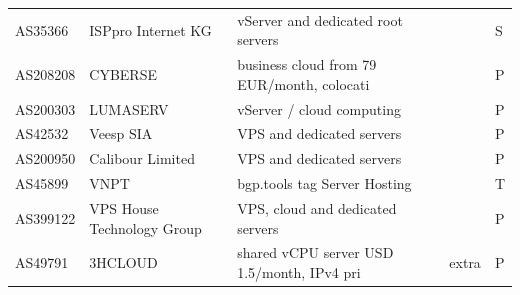 \begin{table}[t]
\begin{tabular*}{\linewidth}{@{\extracolsep{\fill}}lllrll}
AS35366 & ISPpro Internet KG & vServer and dedicated root servers &  &  & S \\ 
AS208208 & CYBERSE & business cloud from 79 EUR/month, colocati &  &  & P \\ 
AS200303 & LUMASERV & vServer / cloud computing &  &  & P \\ 
AS42532 & Veesp SIA & VPS and dedicated servers &  &  & P \\ 
AS200950 & Calibour Limited & VPS and dedicated servers &  &  & P \\ 
AS45899 & VNPT & bgp.tools tag Server Hosting &  &  & T \\ 
AS399122 & VPS House Technology Group & VPS, cloud and dedicated servers &  &  & P \\ 
AS49791 & 3HCLOUD & shared vCPU server USD 1.5/month, IPv4 pri &  & extra & P \\ 
\bottomrule
\end{tabular*}
\label{table-survey-rentable}
\end{table}
